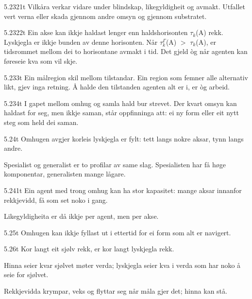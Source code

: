 \begin{formproposition}{5.2321}{t}
Vilkåra verkar vidare under blindskap, likegyldigheit og avmakt. Utfallet vert verna eller skada gjennom andre omsyn og gjennom substratet.
\end{formproposition}

\begin{formproposition}{5.2322}{t}
Ein akse kan ikkje haldast lenger enn haldshorisonten \(τ_{k}\)(A) rekk. Lyskjegla er ikkje bunden av denne horisonten. Når \(τ^{Γ}_{k}\)(A) \(>\) \(τ_{k}\)(A), er tidsrommet mellom dei to horisontane avmakt i tid. Det gjeld òg når agenten kan føreseie kva som vil skje.
\end{formproposition}

\begin{formproposition}{5.233}{t}
Ein målregion skil mellom tilstandar. Ein region som femner alle alternativ likt, gjev inga retning. Å halde den tilstanden agenten alt er i, er òg arbeid.
\end{formproposition}

\begin{formproposition}{5.234}{t}
I gapet mellom omhug og samla hald bur strevet. Der kvart omsyn kan haldast for seg, men ikkje saman, står oppfinninga att: ei ny form eller eit nytt steg som held dei saman.
\end{formproposition}

\begin{formproposition}{5.24}{t}
Omhugen avgjer korleis lyskjegla er fylt: tett langs nokre aksar, tynn langs andre.

Spesialist og generalist er to profilar av same slag. Spesialisten har få høge komponentar, generalisten mange lågare.
\end{formproposition}

\begin{formproposition}{5.241}{t}
Ein agent med trong omhug kan ha stor kapasitet: mange aksar innanfor rekkjevidd, få som set noko i gang.

Likegyldigheita er då ikkje per agent, men per akse.
\end{formproposition}

\begin{formproposition}{5.25}{t}
Omhugen kan ikkje fyllast ut i ettertid for ei form som alt er navigert.
\end{formproposition}

\begin{formproposition}{5.26}{t}
Kor langt eit sjølv rekk, er kor langt lyskjegla rekk.

Hinna seier kvar sjølvet møter verda; lyskjegla seier kva i verda som har noko å seie for sjølvet.

Rekkjevidda krympar, veks og flyttar seg når måla gjer det; hinna kan stå.
\end{formproposition}

